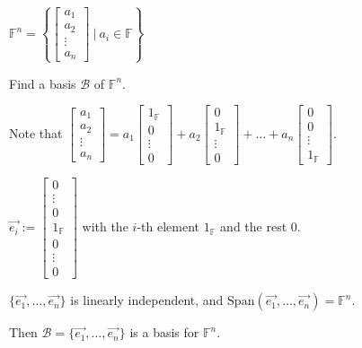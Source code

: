 \documentclass[11pt,fleqn]{book} %
\begin{document}
\begin{example}
{~~~}

    $\mathbb{F}^n = \left\{ \begin{bmatrix} a_1\\a_2\\\vdots\\a_n \end{bmatrix} ~|~a_i \in \mathbb{F} \right\}$
    
    Find a basis $\mathcal{B}$ of $\mathbb{F}^n$. 
    
    Note that $\begin{bmatrix} a_1\\a_2\\\vdots\\a_n \end{bmatrix} = a_1\begin{bmatrix}1_{\mathbb{F}}\\0\\\vdots\\0 \end{bmatrix} + a_2\begin{bmatrix} 0\\1_{\mathbb{F}}\\\vdots\\0 \end{bmatrix} + \dots + a_n\begin{bmatrix} 0\\0\\\vdots\\1_{\mathbb{F}} \end{bmatrix}$. 
    
    $\overrightarrow{e_i} := \begin{bmatrix} 0\\\vdots\\0\\1_{\mathbb{F}}\\0\\\vdots\\0 \end{bmatrix}$ with the $i$-th element $1_\mathbb{F}$ and the rest $0$. 
    
    $\{\overrightarrow{e_1}, \dots, \overrightarrow{e_n}\}$ is linearly independent, and $\mathrm{Span}\left( \overrightarrow{e_1}, \dots, \overrightarrow{e_n} \right) = \mathbb{F}^n$. 
    
    Then $\mathcal{B} = \{\overrightarrow{e_1}, \dots, \overrightarrow{e_n}\} $ is a basis for $\mathbb{F}^n$. 
\end{example}
\end{document}
